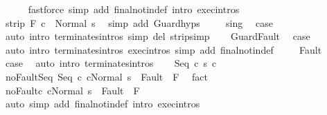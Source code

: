 \begin{isabellebody}
\ \ \ \ \isamarkupfalse%
\ {\isacharparenleft}fastforce\ simp\ add{\isacharcolon}\ final{\isacharunderscore}notin{\isacharunderscore}def\ intro{\isacharcolon}\ exec{\isachardot}intros{\isacharparenright}\isanewline
\ \ \isamarkupfalse%
\ \isamarkupfalse%
\ {\isachardoublequoteopen}strip\ F\ {\isasymGamma}{\isasymturnstile}c\ {\isasymdown}\ Normal\ s{\isachardoublequoteclose}\ \isamarkupfalse%
\ {\isacharparenleft}simp\ add{\isacharcolon}\ Guard{\isachardot}hyps{\isacharparenright}\ \isanewline
\ \ \isamarkupfalse%
\ s{\isacharunderscore}in{\isacharunderscore}g\ \isamarkupfalse%
\ {\isacharquery}case\isanewline
\ \ \ \ \isamarkupfalse%
\ {\isacharparenleft}auto\ intro{\isacharcolon}\ terminates{\isachardot}intros\ simp\ del{\isacharcolon}\ strip{\isacharunderscore}simp{\isacharparenright}\isanewline
{}\isamarkupfalse%
\isanewline
\ \ \isamarkupfalse%
\ GuardFault\ \isamarkupfalse%
\ {\isacharquery}case\ \isanewline
\ \ \ \ \isamarkupfalse%
\ {\isacharparenleft}auto\ intro{\isacharcolon}\ terminates{\isachardot}intros\ exec{\isachardot}intros\ simp\ add{\isacharcolon}\ final{\isacharunderscore}notin{\isacharunderscore}def\ {\isacharparenright}\isanewline
{}\isamarkupfalse%
\isanewline
\ \ \isamarkupfalse%
\ Fault\ \isamarkupfalse%
\ {\isacharquery}case\ \isamarkupfalse%
\ {\isacharparenleft}auto\ intro{\isacharcolon}\ terminates{\isachardot}intros{\isacharparenright}\isanewline
{}\isamarkupfalse%
\isanewline
\ \ \isamarkupfalse%
\ {\isacharparenleft}Seq\ c{}\ s\ c{}{\isacharparenright}\ \isanewline
\ \ \isamarkupfalse%
\ noFault{\isacharunderscore}Seq{\isacharcolon}\ {\isachardoublequoteopen}{\isasymGamma}{\isasymturnstile}{\isasymlangle}Seq\ c{}\ c{}{\isacharcomma}Normal\ s\ {\isasymrangle}\ {\isasymRightarrow}{\isasymnotin}Fault\ {\isacharbackquote}\ F{\isachardoublequoteclose}\ \isamarkupfalse%
\ fact\isanewline
\ \ \isamarkupfalse%
\ noFault{\isacharunderscore}c{}{\isacharcolon}\ {\isachardoublequoteopen}{\isasymGamma}{\isasymturnstile}{\isasymlangle}c{}{\isacharcomma}Normal\ s\ {\isasymrangle}\ {\isasymRightarrow}{\isasymnotin}Fault\ {\isacharbackquote}\ F{\isachardoublequoteclose}\isanewline
\ \ \ \ \isamarkupfalse%
\ {\isacharparenleft}auto\ simp\ add{\isacharcolon}\ final{\isacharunderscore}notin{\isacharunderscore}def\ intro{\isacharcolon}\ exec{\isachardot}intros{\isacharparenright}\isanewline

\end{isabellebody}
